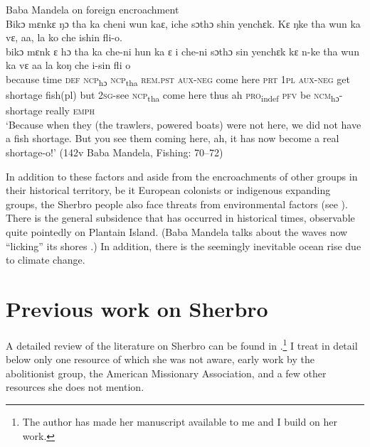 \ea 
\label{ex:2}{Baba Mandela on foreign encroachment}\\
\vspace{6pt}
Bikɔ mɛnkɛ ŋɔ tha ka cheni wun kaɛ, iche sɔthɔ shin yenchɛk. Kɛ ŋke tha wun ka vɛ, aa, la ko che ishin fli-o.\\
\gll bikɔ    mɛnk    ɛ    hɔ    tha    ka      che-ni    hun    ka    ɛ i    che-ni    sɔthɔ    sin      yenchɛk kɛ    n-ke    tha    wun  ka    vɛ aa  la      koŋ    che    i-sin          fli      o\\
because  time    \textsc{def}  \textsc{ncp}\textsubscript{hɔ}  \textsc{ncp}\textsubscript{tha}    \textsc{rem.pst}  \textsc{aux-neg}  come    here  \textsc{prt} \textsc{1pl}  \textsc{aux-neg}  get    shortage  fish(pl) but  2\textsc{sg}{}-see  \textsc{ncp}\textsubscript{tha}    come  here  thus ah  \textsc{pro}\textsubscript{indef}  \textsc{pfv}    be      \textsc{ncm}\textsubscript{hɔ}{}-shortage  really    \textsc{emph}\\
\glt ‘Because when they (the trawlers, powered boats) were not here, we did not have a fish shortage. But you see them coming here, ah, it has now become a real shortage-o!' (142v Baba Mandela, Fishing: 70--72)\\
\z

In addition to these factors and aside from the encroachments of other groups in their historical territory, be it European colonists or indigenous expanding groups, the Sherbro people also face threats from environmental factors (see ). There is the general subsidence that has occurred in historical times, observable quite pointedly on Plantain Island. (Baba Mandela talks about the waves now “licking” its shores .) In addition, there is the seemingly inevitable ocean rise due to climate change.

\section{Previous work on Sherbro}
\label{sec:1.1}
\hypertarget{Toc115517743}{}
A detailed review of the literature on Sherbro can be found in \citet{Corcoraninprep}.\footnote{The author has made her manuscript available to me and I build on her work.} I treat in detail below only one resource of which she was not aware, early work by the abolitionist group, the American Missionary Association, and a few other resources she does not mention.

